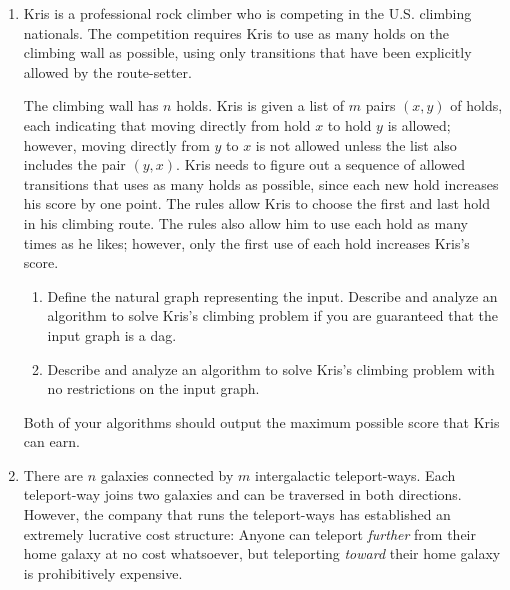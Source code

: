 \begin{exercises}
\begin{enumerate}[label=\arabic*.,ref=\thechapter.\arabic*,leftmargin=*,align=left,itemsep=1.5ex plus 0.5ex,start=12]
\item Kris is a professional rock climber who is competing in the U.S. climbing nationals.
The competition requires Kris to use as many holds on the climbing wall as possible, using only transitions that have been explicitly allowed by the route-setter.

The climbing wall has $n$ holds.
Kris is given a list of $m$ pairs $(x, y)$ of holds, each indicating that moving directly from hold $x$ to hold $y$ is allowed; however, moving directly from $y$ to $x$ is not allowed unless the list also includes the pair $(y, x)$.
Kris needs to figure out a sequence of allowed transitions that uses as many holds as possible, since each new hold increases his score by one point.
The rules allow Kris to choose the first and last hold in his climbing route.
The rules also allow him to use each hold as many times as he likes; however, only the first use of each hold increases Kris’s score.
\begin{enumerate}
\item Define the natural graph representing the input.
Describe and analyze an algorithm to solve Kris’s climbing problem if you are guaranteed that the input graph is a dag.
\item Describe and analyze an algorithm to solve Kris’s climbing problem with no restrictions on the input graph.
\end{enumerate}
Both of your algorithms should output the maximum possible score that Kris can earn.

\item There are $n$ galaxies connected by $m$ intergalactic teleport-ways.
Each teleport-way joins two galaxies and can be traversed in both directions.
However, the company that runs the teleport-ways has established an extremely lucrative cost structure: Anyone can teleport \textit{further} from their home galaxy at no cost whatsoever, but teleporting \textit{toward} their home galaxy is prohibitively expensive.


\end{enumerate}
\end{exercises}
